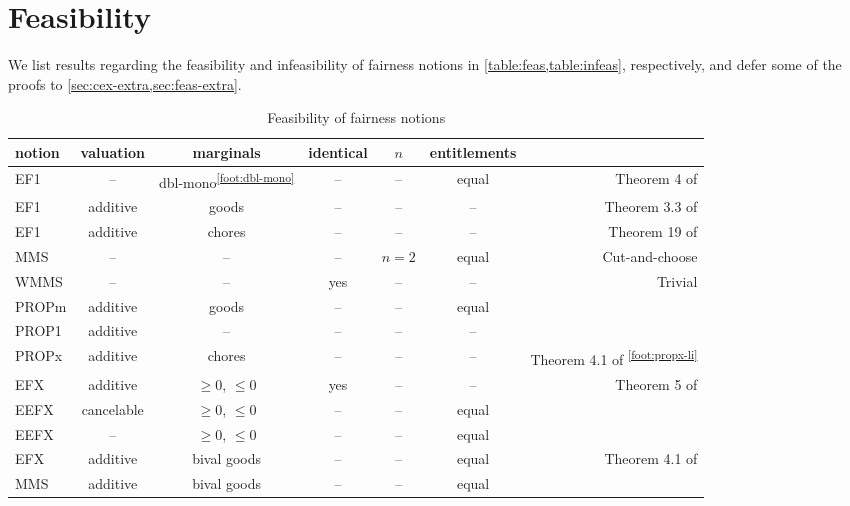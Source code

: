 \section{Feasibility}
\label{sec:feas}

We list results regarding the feasibility and infeasibility of fairness notions
in \cref{table:feas,table:infeas}, respectively,
and defer some of the proofs to \cref{sec:cex-extra,sec:feas-extra}.

\begin{table}[htb]
\centering
\caption{Feasibility of fairness notions}
\label{table:feas}
\begin{tabular}{lcccccr}
\toprule \scriptsize notion & \scriptsize valuation & \scriptsize marginals & \scriptsize identical & \scriptsize $n$ & \scriptsize entitlements &
\\ \midrule EF1 & -- & dbl-mono\textsuperscript{\ref{foot:dbl-mono}} & -- & -- & equal
    & Theorem 4 of \cite{bhaskar2021approximate}
\\[\defaultaddspace] EF1 & additive & goods & -- & -- & --
    & Theorem 3.3 of \cite{chakraborty2021weighted}
\\[\defaultaddspace] EF1 & additive & chores & -- & -- & --
    & Theorem 19 of \cite{springer2024almost}
\\[\defaultaddspace] MMS & -- & -- & -- & $n=2$ & equal
    & Cut-and-choose
\\[\defaultaddspace] WMMS & -- & -- & yes & -- & --
    & Trivial
\\[\defaultaddspace] PROPm & additive & goods & -- & -- & equal
    & \cite{baklanov2021propm}
\\[\defaultaddspace] PROP1 & additive & -- & -- & -- & --
    & \cite{aziz2020polynomial}
\\[\defaultaddspace] PROPx & additive & chores & -- & -- & --
    & Theorem 4.1 of \cite{li2022almost}\textsuperscript{\ref{foot:propx-li}}
\\[\defaultaddspace] EFX & additive & $\ge 0$, $\le 0$ & yes & -- & --
    & Theorem 5 of \cite{springer2024almost}
\\[\defaultaddspace] EEFX & cancelable & $\ge 0$, $\le 0$ & -- & -- & equal
    & \cite{caragiannis2023new,caragiannis2022existence}
\\[\defaultaddspace] EEFX & -- & $\ge 0$, $\le 0$ & -- & -- & equal
    & \cite{akrami2024epistemic}
\\[\defaultaddspace] EFX & additive & bival goods & -- & -- & equal
    & Theorem 4.1 of \cite{amanatidis2021maximum}
\\[\defaultaddspace] MMS & additive & bival goods & -- & -- & equal

\end{tabular}
\end{table}
